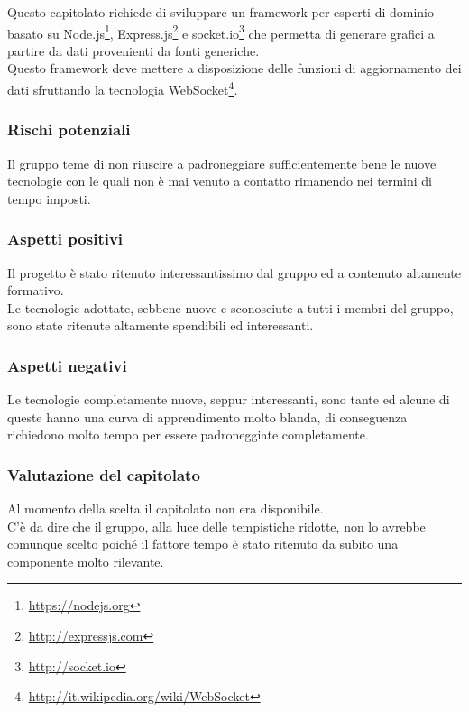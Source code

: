 Questo capitolato richiede di sviluppare un \gls{framework} per esperti di dominio basato su Node.js\footnote{\url{https://nodejs.org}}, Express.js\footnote{\url{http://expressjs.com}} e socket.io\footnote{\url{http://socket.io}} che permetta di generare grafici a partire da dati provenienti da fonti generiche. \\
Questo \gls{framework} deve mettere a disposizione delle funzioni di aggiornamento dei dati sfruttando la tecnologia WebSocket\footnote{\url{http://it.wikipedia.org/wiki/WebSocket}}.
\subsubsection{Rischi potenziali} 
Il gruppo teme di non riuscire a padroneggiare sufficientemente bene le nuove tecnologie con le quali non è mai venuto a contatto rimanendo nei termini di tempo imposti.
\subsubsection{Aspetti positivi}
Il progetto è stato ritenuto interessantissimo dal gruppo ed a contenuto altamente formativo. \\
Le tecnologie adottate, sebbene nuove e sconosciute a tutti i membri del gruppo, sono state ritenute altamente spendibili ed interessanti.
\subsubsection{Aspetti negativi}
Le tecnologie completamente nuove, seppur interessanti, sono tante ed alcune di queste hanno una curva di apprendimento molto blanda, di conseguenza richiedono molto tempo per essere padroneggiate completamente.
\subsubsection{Valutazione del capitolato}
Al momento della scelta il capitolato non era disponibile.\\ C’è da dire che il gruppo, alla luce delle tempistiche ridotte, non lo avrebbe comunque scelto poiché il fattore tempo è stato ritenuto da subito una componente molto rilevante.

